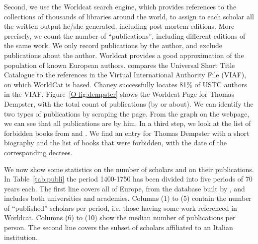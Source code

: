 Second, we use the Worldcat search engine, which provides references to the collections of thousands of libraries around the world, to assign to each scholar all the written output he/she generated, including post mortem editions.  More precisely, we count the number of ``publications'', including different editions of the same work. We only record publications by the author, and exclude publications about the author. Worldcat provides a good approximation of the population of known European authors.
  compares the Universal Short Title Catalogue \cite{USTC} to the references in the Virtual International Authority File (VIAF), on which WorldCat is based. Chaney successfully locates 81\% of USTC authors in the VIAF.
Figure~\ref{O-fig:dempster} shows the Worldcat Page for Thomas Dempster, with the total count of publications (by or about). We can identify the two types of publications by scraping the page. From the graph on the webpage, we can see that all publications are by him.
In a third step, we look at the list of forbidden books from  and . We find an entry for Thomas Dempster with a short biography and the list of books that were forbidden, with the date of the corresponding decrees.


We now show some statistics on the number of scholars and on their publications. In Table~\ref{tab:publi} the period 1400-1750 has been divided into five periods of 70 years each.
The first line covers all of Europe, from the database built by , and includes both universities and academies. Columns (1) to (5) contain the number of ``published'' scholars per period, i.e. those having some work referenced in Worldcat.  Columns (6) to (10) show the median number of publications per person. The second line covers the subset of scholars affiliated to an Italian institution.

